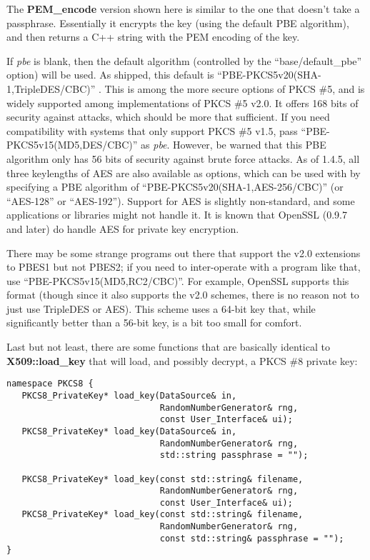 \documentclass{article}
\newcommand{\function}[1]{\textbf{#1}}
\renewcommand{\arg}[1]{\textsl{#1}}
\begin{document}
The \function{PEM\_encode} version shown here is similar to the one that
doesn't take a passphrase. Essentially it encrypts the key (using the default
PBE algorithm), and then returns a C++ string with the PEM encoding of the key.

If \arg{pbe} is blank, then the default algorithm (controlled by the
``base/default\_pbe'' option) will be used. As shipped, this default is
``PBE-PKCS5v20(SHA-1,TripleDES/CBC)'' . This is among the more secure options
of PKCS \#5, and is widely supported among implementations of PKCS \#5 v2.0. It
offers 168 bits of security against attacks, which should be more that
sufficient. If you need compatibility with systems that only support PKCS \#5
v1.5, pass ``PBE-PKCS5v15(MD5,DES/CBC)'' as \arg{pbe}. However, be warned that
this PBE algorithm only has 56 bits of security against brute force attacks. As
of 1.4.5, all three keylengths of AES are also available as options, which can
be used with by specifying a PBE algorithm of
``PBE-PKCS5v20(SHA-1,AES-256/CBC)'' (or ``AES-128'' or ``AES-192''). Support
for AES is slightly non-standard, and some applications or libraries might not
handle it. It is known that OpenSSL (0.9.7 and later) do handle AES for private
key encryption.

There may be some strange programs out there that support the v2.0 extensions
to PBES1 but not PBES2; if you need to inter-operate with a program like that,
use ``PBE-PKCS5v15(MD5,RC2/CBC)''. For example, OpenSSL supports this format
(though since it also supports the v2.0 schemes, there is no reason not to just
use TripleDES or AES). This scheme uses a 64-bit key that, while
significantly better than a 56-bit key, is a bit too small for comfort.

Last but not least, there are some functions that are basically identical to
\function{X509::load\_key} that will load, and possibly decrypt, a PKCS \#8
private key:

\begin{verbatim}
namespace PKCS8 {
   PKCS8_PrivateKey* load_key(DataSource& in,
                              RandomNumberGenerator& rng,
                              const User_Interface& ui);
   PKCS8_PrivateKey* load_key(DataSource& in,
                              RandomNumberGenerator& rng,
                              std::string passphrase = "");

   PKCS8_PrivateKey* load_key(const std::string& filename,
                              RandomNumberGenerator& rng,
                              const User_Interface& ui);
   PKCS8_PrivateKey* load_key(const std::string& filename,
                              RandomNumberGenerator& rng,
                              const std::string& passphrase = "");
}
\end{verbatim}
\end{document}
